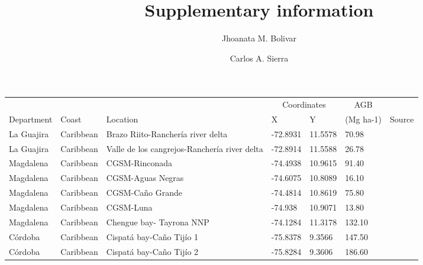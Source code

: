 \documentclass[review, authoryear]{elsarticle}   	%
\begin{document}
\begin{frontmatter}

\title{Supplementary information}
\author[MPI,CYB]{Jhoanata M. Bolivar}
\author[MPI,CYB]{Carlos A. Sierra}
\address[MPI]{Max Planck Institute for Biogeochemistry, Hans-Kn\"oll-Str. 10, 07745 Jena, Germany}
\address[CYB]{Research Center on Ecosystems and Global Change Carbono \& Bosques, Medell\'in, Colombia}


\end{frontmatter}


\begin{table}[htbp]
   \centering \tiny
   \begin{tabular}{p{2.0cm}p{2.0cm}p{4.0cm}p{1.0cm}p{1.0cm}p{2.0cm}p{2.5cm}} %
      \toprule 
        &&&\multicolumn{2}{c}{Coordinates}&\multicolumn{1}{c}{AGB}&\\      
      Department&Coast&Location&X&Y&(Mg ha-1)&Source\\
            \midrule 
La Guajira&Caribbean&Brazo Riito-Rancher\'{i}a river delta&-72.8931&11.5578&70.98&\citet{Lema2007}\\ 
La Guajira&Caribbean&Valle de los cangrejos-Rancher\'{i}a river delta&-72.8914&11.5588&26.78&\citet{Lema2007}\\ 
Magdalena&Caribbean&CGSM-Rinconada&-74.4938&10.9615&91.40&\citet{DelaPena2010}\\ 
Magdalena&Caribbean&CGSM-Aguas Negras&-74.6075&10.8089&16.10&\citet{DelaPena2010}\\ 
Magdalena&Caribbean&CGSM-Ca\~{n}o Grande&-74.4814&10.8619&75.80&\citet{DelaPena2010}\\ 
Magdalena&Caribbean&CGSM-Luna&-74.938&10.9071&13.80&\citet{DelaPena2010}\\ 
Magdalena&Caribbean&Chengue bay- Tayrona NNP&-74.1284&11.3178&132.10&\citet{INVEMAR2007}\\ 
C\'{o}rdoba&Caribbean&Cispat\'{a} bay-Ca\~{n}o Tij\'{io} 1&-75.8378&9.3566&147.50&\citet{Bolivar_inpreparation}\\ 
C\'{o}rdoba&Caribbean&Cispat\'{a} bay-Ca\~{n}o Tij\'{io} 2&-75.8284&9.3606&186.60&\citet{Bolivar_inpreparation}\\ 

\end{tabular}
\end{table}
\end{document}

